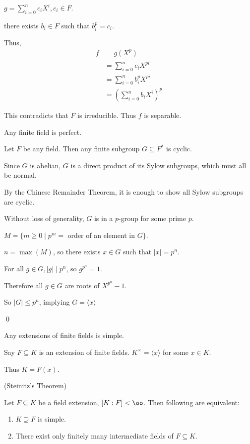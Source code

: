 \documentclass[x11names,reqno,14pt]{extarticle}
\begin{document}
$g = \sum_{i=0}^nc_iX^i, c_i \in F$. 

there exists $b_i \in F$ such that $b_i^p = c_i$. 

Thus, 
\begin{align*}
f & = g(X^p) \\
  & = \sum_{i=0}^n c_i X^{pi} \\
  & = \sum_{i=0}^n b_i^p X^{pi} \\
  & = \left(\sum_{i=0}^nb_iX^i\right)^p
\end{align*}

This contradicts that $F$ is irreducible. Thus $f$ is separable.

\cor

Any finite field is perfect. 

\lem Let $F$ be any field. Then any finite subgroup $G \subseteq F^*$ is cyclic.

\proof

Since $G$ is abelian, $G$ is a direct product of its Sylow subgroups, which must all be normal. 

By the Chinese Remainder Theorem, it is enough to show all Sylow subgroups are cyclic. 

Without loss of generality, $G$ is in a $p$-group for some prime $p$. 

$M = \{m \geq 0 \mid p^m = $ order of an element in $G\}$. 

$n = \max(M)$, so there exists $x \in G$ such that $|x| = p^n$. 

For all $g \in G, |g| \mid p^n$, so $g^{p^n} = 1$. 

Therefore all $g \in G$ are roots of $X^{p^n} - 1$. 

So $|G| \leq p^n$, implying $G = \langle x \rangle$

\qed

\cor

Any extensions of finite fields is simple.

\proof

Say $F \subseteq K$ is an extension of finite fields. $K^\times = \langle x \rangle$ for some $x \in K$. 

Thus $K = F(x)$. 

\thm (Steinitz's Theorem)

Let $F \subseteq K$ be a field extension, $[K:F]<\oo$. Then following are equivalent:

\begin{enumerate}

\item $K \supseteq F$ is simple. 

\item There exist only finitely many intermediate fields of $F \subseteq K$. 

\end{enumerate}
\end{document}
